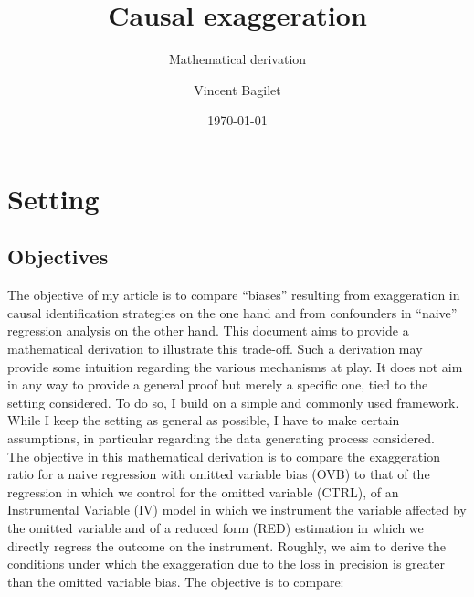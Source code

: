 \documentclass[a4paper, 11pt]{report}
\begin{document}

	
	\title{Causal exaggeration}
	\subtitle{Mathematical derivation}

	\author{Vincent Bagilet}
	

	\date{\today}
	
	\maketitle
		
	\tableofcontents
	
	\newpage
	
	\section{Setting}
	
		\subsection{Objectives}\label{maths_objectives}
	
			The objective of my article is to compare ``biases'' resulting from exaggeration in causal identification strategies on the one hand and from confounders in ``naive'' regression analysis on the other hand.  This document aims to provide a mathematical derivation to illustrate this trade-off. Such a derivation may provide some intuition regarding the various mechanisms at play. It does not aim in any way to provide a general proof but merely a specific one, tied to the setting considered. To do so, I build on a simple and commonly used framework. While I keep the setting as general as possible, I have to make certain assumptions, in particular regarding the data generating process considered.\\
		
		The objective in this mathematical derivation is to compare the exaggeration ratio for a naive regression with omitted variable bias (OVB) to that of the regression in which we control for the omitted variable (CTRL), of an Instrumental Variable (IV) model in which we instrument the variable affected by the omitted variable and of a reduced form (RED) estimation in which we directly regress the outcome on the instrument. %
		Roughly, we aim to derive the conditions under which the exaggeration due to the loss in precision is greater than the omitted variable bias. %
		The objective is to compare:
		
\end{document}
